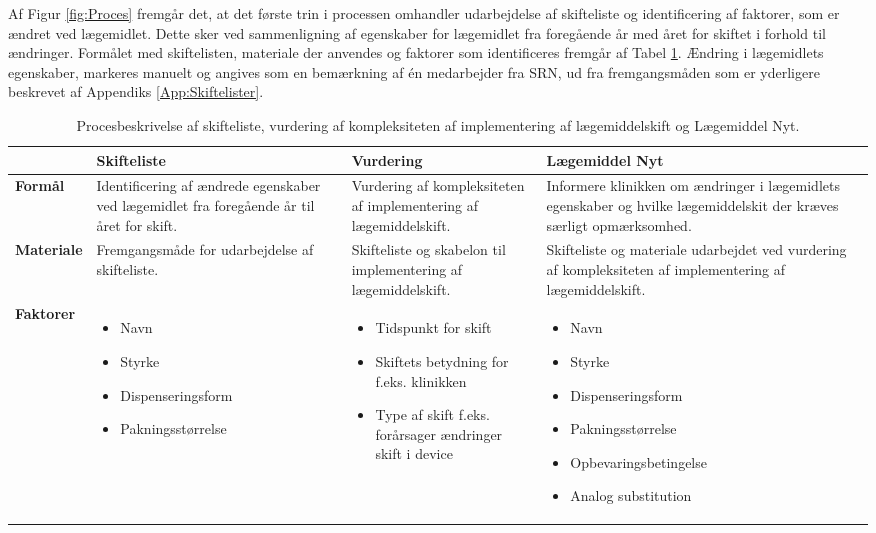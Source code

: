 Af Figur \ref{fig:Proces} fremgår det, at det første trin i processen omhandler udarbejdelse af skifteliste og identificering af faktorer, som er ændret ved lægemidlet. Dette sker ved sammenligning af egenskaber for lægemidlet fra foregående år med året for skiftet i forhold til ændringer. Formålet med skiftelisten, materiale der anvendes og faktorer som identificeres fremgår af Tabel \ref{table:Proces}. Ændring i lægemidlets egenskaber, markeres manuelt og angives som en bemærkning af én medarbejder fra SRN, ud fra fremgangsmåden som er yderligere beskrevet af Appendiks \ref{App:Skiftelister}.

\begin{table}[H]
\caption{Procesbeskrivelse af skifteliste, vurdering af kompleksiteten af implementering af lægemiddelskift og Lægemiddel Nyt.}
\label{table:Proces}
\centering
\begin{tabular}{p{1.8cm}|p{3.5cm}|p{3.5cm}|p{4.2cm}}
\cellcolor[HTML]{C0C0C0}\textbf{} & \cellcolor[HTML]{C0C0C0}\textbf{Skifteliste} & \cellcolor[HTML]{C0C0C0}\textbf{Vurdering} & \cellcolor[HTML]{C0C0C0}\textbf{Lægemiddel Nyt}\\ \hline
\cellcolor[HTML]{C0C0C0}\textbf{Formål} & Identificering af ændrede egenskaber ved lægemidlet fra foregående år til året for skift. & Vurdering af kompleksiteten af implementering af lægemiddelskift. & Informere klinikken om ændringer i lægemidlets egenskaber og hvilke lægemiddelskit der kræves særligt opmærksomhed. \\ \hline
\cellcolor[HTML]{C0C0C0}\textbf{Materiale} & Fremgangsmåde for udarbejdelse af skifteliste. & Skifteliste  og skabelon til implementering af lægemiddelskift. & Skifteliste og materiale udarbejdet ved vurdering af kompleksiteten af implementering af lægemiddelskift. \\ \hline
\cellcolor[HTML]{C0C0C0}\textbf{Faktorer} & \vspace{-0.2cm}\begin{itemize}[topsep=-0.5cm,leftmargin=0.3cm] \item Navn \item Styrke\item Dispenseringsform \item Pakningsstørrelse \end{itemize} & \vspace{-0.2cm}\begin{itemize}[topsep=-0.5cm,leftmargin=0.3cm] \item Tidspunkt for skift\item Skiftets betydning for f.eks. klinikken \item Type af skift f.eks. forårsager ændringer skift i device \end{itemize}  & \vspace{-0.2cm}\begin{itemize}[topsep=-0.5cm,leftmargin=0.3cm] \item Navn \item Styrke \item Dispenseringsform \item Pakningsstørrelse \item Opbevaringsbetingelse \item Analog substitution  \end{itemize}    

\end{tabular}
\end{table}

